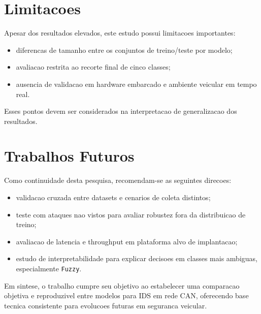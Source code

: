 \section{Limitacoes}

Apesar dos resultados elevados, este estudo possui limitacoes importantes:

\begin{itemize}
	\item diferencas de tamanho entre os conjuntos de treino/teste por modelo;
	\item avaliacao restrita ao recorte final de cinco classes;
	\item ausencia de validacao em hardware embarcado e ambiente veicular em tempo real.
\end{itemize}

Esses pontos devem ser considerados na interpretacao de generalizacao dos resultados.

\section{Trabalhos Futuros}

Como continuidade desta pesquisa, recomendam-se as seguintes direcoes:

\begin{itemize}
	\item validacao cruzada entre datasets e cenarios de coleta distintos;
	\item teste com ataques nao vistos para avaliar robustez fora da distribuicao de treino;
	\item avaliacao de latencia e throughput em plataforma alvo de implantacao;
	\item estudo de interpretabilidade para explicar decisoes em classes mais ambiguas, especialmente \texttt{Fuzzy}.
\end{itemize}

Em sintese, o trabalho cumpre seu objetivo ao estabelecer uma comparacao objetiva e reproduzivel entre modelos para IDS em rede CAN, oferecendo base tecnica consistente para evolucoes futuras em seguranca veicular.


